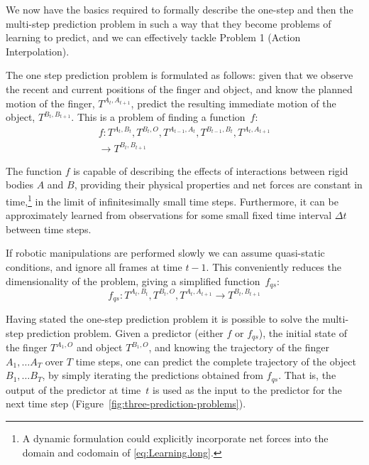We now have the basics required to formally describe the one-step and then the multi-step prediction
problem in such a way that they become problems of learning to predict, and we can effectively tackle Problem 1 (Action Interpolation).

 The one step prediction problem is formulated as follows: given that we observe the recent and current positions of the finger and object, and know the planned motion of the finger, $T^{A_{t},  A_{t+1}}$, predict the resulting immediate motion of the object,
$T^{B_{t}, B_{t+1}}$.  This is a problem of finding a function~$f$:
\begin{multline}
f: T^{A_t, B_t}, T^{B_t, O}, T^{A_{t-1}, A_{t}}, T^{B_{t-1}, B_{t}}, T^{A_{t}, A_{t+1}} \\ \longrightarrow T^{B_{t}, B_{t+1}}
\label{eq:Learning.long}
\end{multline}

The function $f$ is capable of describing the effects of interactions between rigid bodies $A$ and $B$, providing their physical properties and net forces are constant
in time,\footnote{A dynamic formulation could explicitly incorporate
net forces into the domain and codomain of \eqref{eq:Learning.long}.}
in the limit of infinitesimally small time steps.
Furthermore, it can be approximately learned from observations
for some small fixed time interval $\Delta t$ between time steps.

If robotic manipulations are performed slowly we can assume quasi-static conditions, and ignore all frames at time $t-1$.  This conveniently reduces the dimensionality of the problem, giving a simplified function~$f_{qs}$:
\begin{equation}
f_{qs}: T^{A_t, B_t}, T^{B_t, O}, T^{A_{t}, A_{t+1}} \longrightarrow T^{B_{t}, B_{t+1}}
\label{eq:Learning.short}
\end{equation}

 Having stated the one-step prediction problem it is possible to solve
the multi-step prediction problem. Given a predictor (either $f$ or
$f_{qs}$), the initial state of the finger $T^{A_{1}, O}$ and object
$T^{B_{1}, O}$, and knowing the trajectory of the finger $A_{1},
\ldots A_{T}$ over $T$ time steps, one can predict the complete
trajectory of the object $B_{1}, \ldots B_{T}$, by simply iterating
the predictions obtained from $f_{qs}$.  That is, the output of the
predictor at time~$t$ is used as the input to the predictor for the
next time step (Figure~\ref{fig:three-prediction-problems}).

